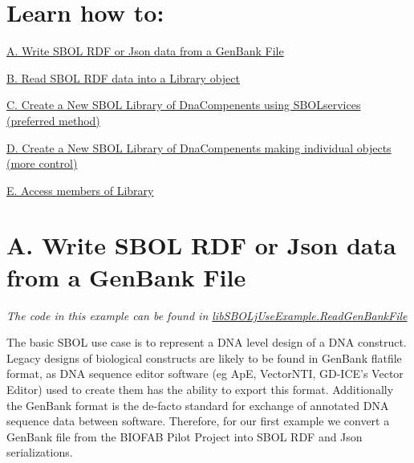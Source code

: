 \hypertarget{tutorial_sec_toc}{}\section{Learn how to:}\label{tutorial_sec_toc}
\hyperlink{tutorial_A}{A. Write SBOL RDF or Json data from a GenBank File} \par
 \hyperlink{tutorial_B}{B. Read SBOL RDF data into a Library object} \par
 \hyperlink{tutorial_C}{C. Create a New SBOL Library of DnaCompenents using SBOLservices (preferred method)} \par
 \hyperlink{tutorial_D}{D. Create a New SBOL Library of DnaCompenents making individual objects (more control)} \par
 \hyperlink{tutorial_E}{E. Access members of Library} \par




\hypertarget{tutorial_A}{}\section{A. Write SBOL RDF or Json data from a GenBank File}\label{tutorial_A}
{\itshape The code in this example can be found in \hyperlink{classlib_s_b_o_lj_use_example_1_1_read_gen_bank_file}{libSBOLjUseExample.ReadGenBankFile}\/}

The basic SBOL use case is to represent a DNA level design of a DNA construct. Legacy designs of biological constructs are likely to be found in GenBank flatfile format, as DNA sequence editor software (eg ApE, VectorNTI, GD-\/ICE's Vector Editor) used to create them has the ability to export this format. Additionally the GenBank format is the de-\/facto standard for exchange of annotated DNA sequence data between software. Therefore, for our first example we convert a GenBank file from the BIOFAB Pilot Project into SBOL RDF and Json serializations.


